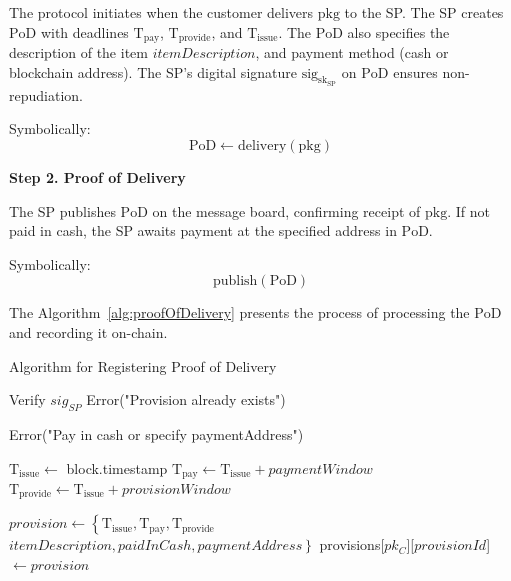 \documentclass[pdftex,twocolumn,epjc3]{svjour3}
\begin{document}
The protocol initiates when the customer delivers $\mathrm{pkg}$ to the SP. The SP creates $\mathrm{PoD}$ with deadlines $\mathrm{T}_\mathrm{pay}$, $\mathrm{T}_\mathrm{provide}$, and $\mathrm{T}_\mathrm{issue}$. The $\mathrm{PoD}$ also specifies the description of the item $itemDescription$, and payment method (cash or blockchain address). The SP's digital signature $\mathrm{sig}_{\mathrm{sk}_\mathrm{SP}}$ on $\mathrm{PoD}$ ensures non-repudiation.

Symbolically: 
\[
\mathrm{PoD \gets delivery(pkg)}
\]

\noindent \textbf{Step 2. Proof of Delivery}\label{step-2-pod}

The SP publishes $\mathrm{PoD}$ on the message board, confirming receipt of $\mathrm{pkg}$. If not paid in cash, the SP awaits payment at the specified address in $\mathrm{PoD}$.

Symbolically: 
\[
\mathrm{publish(PoD)}
\]

The Algorithm~\ref{alg:proofOfDelivery} presents the process of processing the $\mathrm{PoD}$ and recording it on-chain.

\begin{algorithm}
\caption{Algorithm for Registering Proof of Delivery}
\label{alg:proofOfDelivery}
\begin{algorithmic}[1]
    \State Verify $sig_{SP}$
        \State \Return Error("Provision already exists")
    \EndIf

        \State \Return Error("Pay in cash or specify paymentAddress")
    \EndIf
    
    \State $\mathrm{T}_\mathrm{issue} \gets$ block.timestamp
    \State $\mathrm{T}_\mathrm{pay} \gets \mathrm{T}_\mathrm{issue} + paymentWindow$
    \State $\mathrm{T}_\mathrm{provide} \gets \mathrm{T}_\mathrm{issue} + provisionWindow$

    \State $provision \gets \left\{ \mathrm{T}_\mathrm{issue}, \mathrm{T}_\mathrm{pay}, \mathrm{T}_\mathrm{provide} \right.$
    \State \hspace{\algorithmicindent}$\left. itemDescription, paidInCash, paymentAddress \right\}$
    \State provisions[$pk_C$][$provisionId$] $\gets provision$
\EndFunction
\end{algorithmic}
\end{algorithm}
\end{document}

